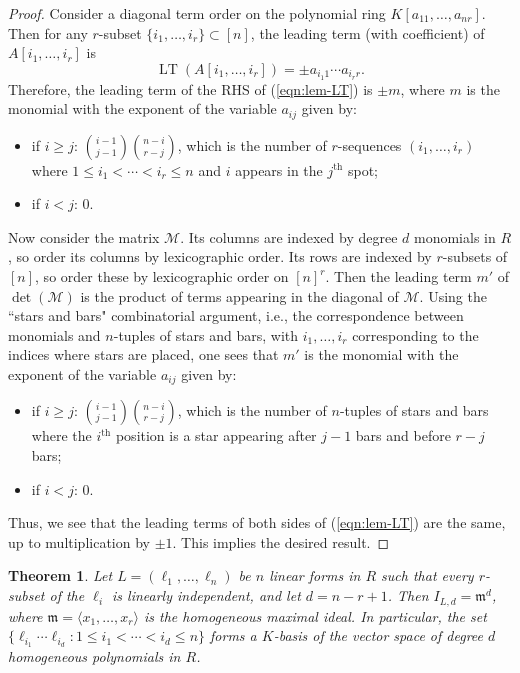 \documentclass [a4paper,reqno, 11pt]{amsart}
\theoremstyle{plain}
\newtheorem{theorem}{Theorem}[section]
\theoremstyle{plain}
\theoremstyle{plain}
\theoremstyle{plain}
\theoremstyle{definition}
\theoremstyle{definition}
\theoremstyle{definition}
\theoremstyle{definition}
\theoremstyle{definition}
\theoremstyle{definition}
\DeclareMathOperator{\LT}{LT}
\begin{document}
\begin{proof}
    Consider a diagonal term order on the polynomial ring $K[a_{11},\ldots,a_{nr}]$. Then for any $r$-subset $\{i_1,\ldots,i_r\}\subset[n]$, the leading term (with coefficient) of $A[i_1,\ldots, i_r]$ is
    \[\LT(A[i_1,\ldots, i_r])=\pm a_{i_1 1}\cdots a_{i_r r}.\]
    Therefore, the leading term of the RHS of (\ref{eqn:lem-LT}) is $\pm m$, where $m$ is the monomial with the exponent of the variable $a_{ij}$ given by: 
    \begin{itemize}
        \item if $i\geq j$: $\binom{i-1}{j-1}\binom{n-i}{r-j}$, which is the number of $r$-sequences $(i_1,\ldots,i_r)$ where $1\leq i_1<\cdots<i_r\leq n$ and $i$ appears in the $j^{\text{th}}$ spot;
        \item if $i<j$: $0$.
    \end{itemize}

    Now consider the matrix $\mathcal{M}$. Its columns are indexed by degree $d$ monomials in $R$, so order its columns by lexicographic order. Its rows are indexed by $r$-subsets of $[n]$, so order these by lexicographic order on $[n]^r$. Then the leading term $m'$ of $\det(\mathcal{M})$ is the product of terms appearing in the diagonal of $\mathcal{M}$. Using the ``stars and bars" combinatorial argument, i.e., the correspondence between monomials and $n$-tuples of stars and bars, with $i_1,\ldots,i_r$ corresponding to the indices where stars are placed, one sees that $m'$ is the monomial with the exponent of the variable $a_{ij}$ given by:
    \begin{itemize}
        \item if $i\geq j$: $\binom{i-1}{j-1}\binom{n-i}{r-j}$, which is the number of $n$-tuples of stars and bars where the $i^{\text{th}}$ position is a star appearing after $j-1$ bars and before $r-j$ bars;
        \item if $i<j$: $0$.
    \end{itemize}
    Thus, we see that the leading terms of both sides of (\ref{eqn:lem-LT}) are the same, up to multiplication by $\pm 1$. This implies the desired result.
\end{proof}

\begin{theorem}\label{thm:generic-m^d}
    Let $L=(\ell_1,\ldots,\ell_n)$ be $n$ linear forms in $R$ such that every $r$-subset of the \(\ell_i\) is linearly independent, and let $d=n-r+1$. 
    Then $I_{L,d}=\mathfrak{m}^d$, where $\mathfrak{m}=\langle x_1,\ldots,x_r\rangle$ is the homogeneous maximal ideal. In particular, the set $\{\ell_{i_1}\cdots\ell_{i_d}:1\leq i_1<\cdots<i_d\leq n\}$ forms a $K$-basis of the vector space of degree $d$ homogeneous polynomials in $R$.
\end{theorem}
\end{document}
